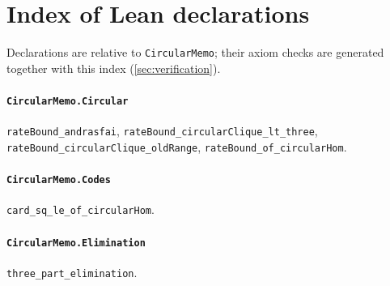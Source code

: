\section{Index of Lean declarations}\label{sec:leanindex}

Declarations are relative to \texttt{CircularMemo}; their axiom checks are generated together with this index (\cref{sec:verification}).

\paragraph{\texttt{CircularMemo.Circular}}
{\small\raggedright \texttt{rateBound\_andrasfai}, \texttt{rateBound\_circularClique\_lt\_three}, \texttt{rateBound\_circularClique\_oldRange}, \texttt{rateBound\_of\_circularHom}.\par}

\paragraph{\texttt{CircularMemo.Codes}}
{\small\raggedright \texttt{card\_sq\_le\_of\_circularHom}.\par}

\paragraph{\texttt{CircularMemo.Elimination}}
{\small\raggedright \texttt{three\_part\_elimination}.\par}
